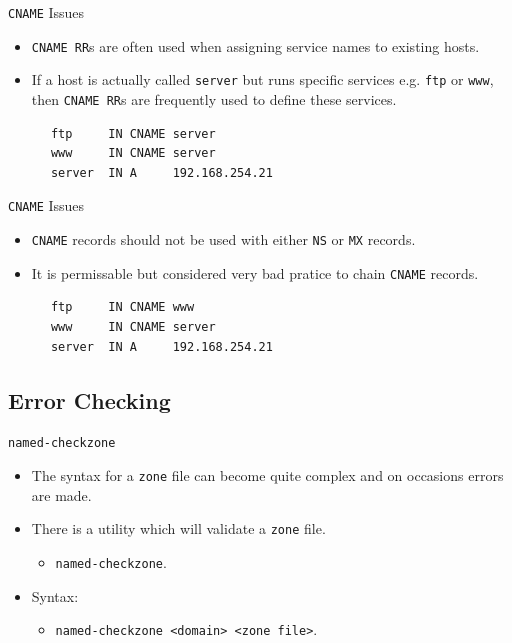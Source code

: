 \documentclass[xcolor=table]{beamer}
\begin{document}
\begin{frame}[fragile]{\texttt{CNAME} Issues}
  \begin{itemize}
    \item \texttt{CNAME RR}s are often used when assigning service names to existing hosts.
    \item If a host is actually called \texttt{server} but runs specific services e.g. \texttt{ftp} or \texttt{www}, then \texttt{CNAME RR}s are frequently used to define these services.
  \end{itemize}
  \begin{tcolorbox}
    \lstset{
      basicstyle=\scriptsize\ttfamily,
    }
    \begin{lstlisting}
      ftp     IN CNAME server
      www     IN CNAME server
      server  IN A     192.168.254.21
    \end{lstlisting}
  \end{tcolorbox}
\end{frame}

\begin{frame}[fragile]{\texttt{CNAME} Issues}
  \begin{itemize}
    \item \texttt{CNAME} records should not be used with either \texttt{NS} or \texttt{MX} records.
    \item It is permissable but considered very bad pratice to chain \texttt{CNAME} records.
  \end{itemize}
  \begin{tcolorbox}
    \lstset{
      basicstyle=\scriptsize\ttfamily,
    }
    \begin{lstlisting}
      ftp     IN CNAME www
      www     IN CNAME server
      server  IN A     192.168.254.21
    \end{lstlisting}
  \end{tcolorbox}
\end{frame}

\subsection{Error Checking}
\begin{frame}{\texttt{named-checkzone}}
  \begin{itemize}
    \item The syntax for a \texttt{zone} file can become quite complex and on occasions errors are made.
    \item There is a utility which will validate a \texttt{zone} file.
      \begin{itemize}
        \item \texttt{named-checkzone}.
      \end{itemize}
    \item Syntax:
      \begin{itemize}
        \item \texttt{named-checkzone <domain> <zone file>}.
      \end{itemize}
  \end{itemize}
\end{frame}
\end{document}
